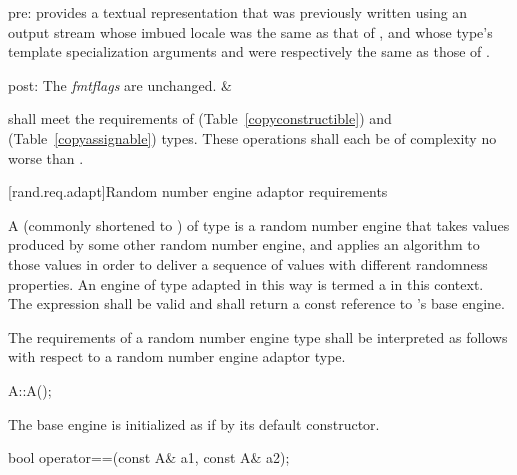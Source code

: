 \begin{libreqtab4d}
    pre:
     provides a textual representation
    that was previously written
    using an output stream
    whose imbued locale
    was the same as that of ,
    and whose type's template specialization arguments
     and 
    were respectively the same as those of .

    post: The \textit{fmtflags} are unchanged.
  & 
  \\
\end{libreqtab4d}

\pnum
{} shall meet the requirements
of  (Table~\ref{copyconstructible})
and  (Table~\ref{copyassignable}) types.
These operations shall each be of complexity
no worse than .


%



[rand.req.adapt]{Random number engine adaptor requirements}%

\pnum
A 
(commonly shortened to )
 of type 
is a random number engine
that takes values
produced by some other random number engine,
and applies an algorithm to those values
in order to deliver a sequence of values
with different randomness properties.
An engine  of type  adapted in this way
is termed a 
in this context.
The expression  shall be valid and shall return a
const reference to 's base engine.

\pnum
The requirements of a random number engine type
shall be interpreted as follows
with respect to a random number engine adaptor type.

\begin{itemdecl}
A::A();
\end{itemdecl}

\begin{itemdescr}
\pnum\effects
 The base engine is initialized
 as if by its default constructor.
\end{itemdescr}

\begin{itemdecl}
bool operator==(const A& a1, const A& a2);
\end{itemdecl}

